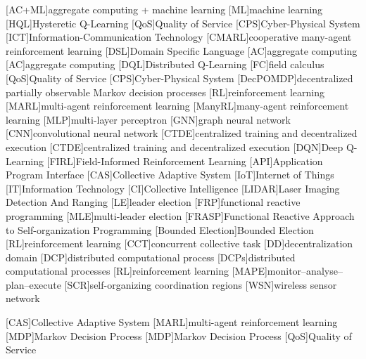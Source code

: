 [AC+ML]{aggregate computing + machine learning}
[ML]{machine learning}
[HQL]{Hysteretic Q-Learning}
[QoS]{Quality of Service}
[CPS]{Cyber-Physical System}
[ICT]{Information-Communication Technology}
[CMARL]{cooperative many-agent reinforcement learning}
[DSL]{Domain Specific Language}
[AC]{aggregate computing}
[AC]{aggregate computing}
[DQL]{Distributed Q-Learning}
[FC]{field calculus}
[QoS]{Quality of Service}
[CPS]{Cyber-Physical System}
[DecPOMDP]{decentralized partially observable Markov decision processes}
[RL]{reinforcement learning}
[MARL]{multi-agent reinforcement learning}
[ManyRL]{many-agent reinforcement learning}
[MLP]{multi-layer perceptron}
[GNN]{graph neural network}
[CNN]{convolutional neural network}
[CTDE]{centralized training and decentralized execution}
[CTDE]{centralized training and decentralized execution}
[DQN]{Deep Q-Learning}
[FIRL]{Field-Informed Reinforcement Learning}
[API]{Application Program Interface}
[CAS]{Collective Adaptive System}
[IoT]{Internet of Things}
[IT]{Information Technology}
[CI]{Collective Intelligence}
[LIDAR]{Laser Imaging Detection And Ranging}
[LE]{leader election}
[FRP]{functional reactive programming}
[MLE]{multi-leader election}
[FRASP]{Functional Reactive Approach to Self-organization Programming}
[Bounded Election]{Bounded Election}
[RL]{reinforcement learning}
[CCT]{concurrent collective task}
[DD]{decentralization domain}
[DCP]{distributed computational process}
[DCPs]{distributed computational processes}
[RL]{reinforcement learning}
[MAPE]{monitor--analyse--plan--execute}
[SCR]{self-organizing coordination regions}
[WSN]{wireless sensor network}

[CAS]{Collective Adaptive System}
[MARL]{multi-agent reinforcement learning}
[MDP]{Markov Decision Process}
[MDP]{Markov Decision Process}
[QoS]{Quality of Service}